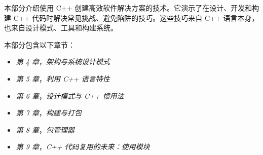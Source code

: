 本部分介绍使用 C++ 创建高效软件解决方案的技术。它演示了在设计、开发和构建 C++ 代码时解决常见挑战、避免陷阱的技巧。这些技巧来自 C++ 语言本身，也来自设计模式、工具和构建系统。

本部分包含以下章节：

\begin{itemize}
\item \emph{第 4 章}，\emph{架构与系统设计模式}
\item \emph{第 5 章}，\emph{利用 C++ 语言特性}
\item \emph{第 6 章}，\emph{设计模式与 C++ 惯用法}
\item \emph{第 7 章}，\emph{构建与打包}
\item \emph{第 8 章}，\emph{包管理器}
\item \emph{第 9 章}，\emph{C++ 代码复用的未来：使用模块}
\end{itemize}
